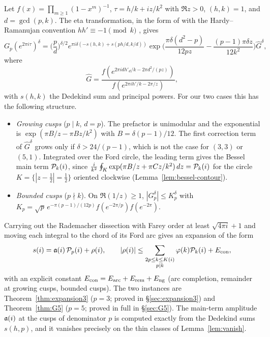 Let $f(x)=\prod_{m\ge1}(1-x^m)^{-1}$, $\tau=h/k+iz/k^2$ with $\Re z>0$, $(h,k)=1$, and $d=\gcd(p,k)$. The eta
transformation, in the form of \cite[Prop.~7]{SZ} with the Hardy--Ramanujan convention $hh'\equiv-1\pmod k$
\cite{Padhi_SZ}, gives
\begin{equation}\label{eq:Gp-transform}
G_p(e^{2\pi i\tau})^\delta=\Big(\frac pd\Big)^{\delta/2}e^{\pi i\delta(-s(h,k)+s(ph/d,k/d))}
\exp\Big(\frac{\pi\delta(d^2-p)}{12pz}-\frac{(p-1)\pi\delta z}{12k^2}\Big)\widehat G^\delta,
\end{equation}
where
\[
\widehat G=\frac{f(e^{2\pi idh'_d/k-2\pi d^2/(pz)})}{f(e^{2\pi ih'/k-2\pi/z})},
\]
with $s(h,k)$ the Dedekind sum and principal powers. For our two cases this has the following structure.
\begin{itemize}
\item \emph{Growing cusps} ($p\mid k$, $d=p$). The prefactor is unimodular and the exponential is
$\exp(\pi B/z-\pi Bz/k^2)$ with $B=\delta(p-1)/12$. The first correction term of $\widehat G^\delta$ grows only if
$\delta>24/(p-1)$, which is not the case for $(3,3)$ or $(5,1)$. Integrated over the Ford circle, the leading term gives
the Bessel main term $\mathcal P_k(i)$, since $\frac{i}{k^2}\oint_K\exp(\pi B/z+\pi Cz/k^2)\,dz=\mathcal P_k(i)$ for the circle
$K=\{|z-\frac12|=\frac12\}$ oriented clockwise (Lemma~\ref{lem:bessel-contour}).
\item \emph{Bounded cusps} ($p\nmid k$). On $\Re(1/z)\ge1$, $|G_p^\delta|\le K_p^\delta$ with
$K_p=\sqrt p\,e^{-\pi(p-1)/(12p)}f(e^{-2\pi/p})f(e^{-2\pi})$.
\end{itemize}
Carrying out the Rademacher dissection with Farey order at least $\sqrt{4\pi i}+1$ and moving each integral to the chord
of its Ford arc gives an expansion of the form
\begin{equation}\label{eq:expansion-shape}
s(i)=\mathfrak a(i)\,\mathcal P_p(i)+\rho(i),\qquad
|\rho(i)|\le\sum_{\substack{2p\le k\le K(i)\\ p\mid k}}\varphi(k)\mathcal P_k(i)+E_{\mathrm{con}} ,
\end{equation}
with an explicit constant $E_{\mathrm{con}}=E_{\rm arc}+E_{\rm rem}+E_{\rm ng}$ (arc completion, remainder at growing cusps, bounded
cusps). The two instances are Theorem~\ref{thm:expansion3} ($p=3$; proved in \S\ref{sec:expansion3}) and
Theorem~\ref{thm:G5} ($p=5$; proved in full in \S\ref{sec:G5}). The main-term amplitude $\mathfrak a(i)$ at the cusps of
denominator $p$ is computed exactly from the Dedekind sums $s(h,p)$, and it vanishes precisely on the thin classes of
Lemma~\ref{lem:vanish}.

